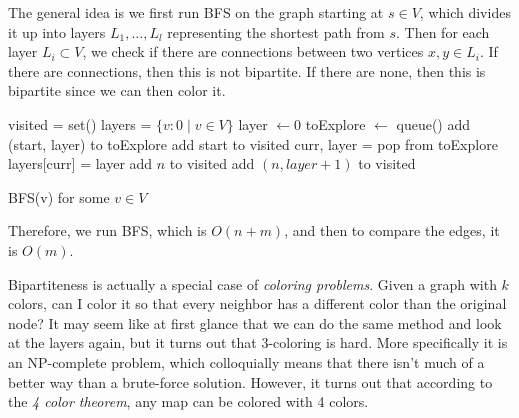 \documentclass{article}
\begin{document}
    \begin{algo}
      The general idea is we first run BFS on the graph starting at $s \in V$, which divides it up into layers $L_1, \ldots, L_l$ representing the shortest path from $s$. Then for each layer $L_i \subset V$, we check if there are connections between two vertices $x, y \in L_i$. If there are connections, then this is not bipartite. If there are none, then this is bipartite since we can then color it. 

      \begin{algorithm}[H]
        \label{alg:determine_bipartite}
        \begin{algorithmic}[1]
          \State visited = set() 
          \State layers = $\{v : 0 \mid v \in V \}$
            \State layer $\gets 0$ 
            \State toExplore $\gets$ queue() 
            \State add (start, layer) to toExplore 
            \State add start to visited
              \State curr, layer = pop from toExplore 
              \State layers[curr] = layer 
                  \State add $n$ to visited 
                  \State add $(n, layer+1)$ to visited 
                \EndIf
              \EndFor
            \EndWhile 
          \EndFunction

          \State 

            \State BFS(v) for some $v \in V$ 
                \State {} 
              \EndIf 
            \EndFor 
            \State {}
          \EndFunction
        \end{algorithmic}
      \end{algorithm}
      Therefore, we run BFS, which is $O(n+m)$, and then to compare the edges, it is $O(m)$. 
    \end{algo}

    Bipartiteness is actually a special case of \textit{coloring problems}. Given a graph with $k$ colors, can I color it so that every neighbor has a different color than the original node? It may seem like at first glance that we can do the same method and look at the layers again, but it turns out that 3-coloring is hard. More specifically it is an NP-complete problem, which colloquially means that there isn't much of a better way than a brute-force solution. However, it turns out that according to the \textit{4 color theorem}, any map can be colored with 4 colors. 
\end{document}
